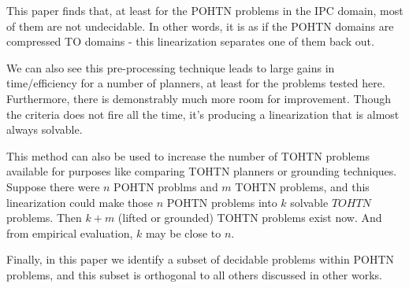 \documentclass[letterpaper]{article} %
\begin{document}
This paper finds that, at least for the POHTN problems in the IPC domain, most of them are not undecidable. In other words, it is as if the POHTN domains are compressed TO domains - this linearization separates one of them back out.

We can also see this pre-processing technique leads to large gains in time/efficiency for a number of planners, at least for the problems tested here. Furthermore, there is demonstrably much more room for improvement. Though the criteria does not fire all the time, it's producing a linearization that is almost always solvable.

This method can also be used to increase the number of TOHTN problems available for purposes like comparing TOHTN planners or grounding techniques. Suppose there were $n$ POHTN problms and $m$ TOHTN problems, and this linearization could make those $n$ POHTN problems into $k$ solvable $TOHTN$ problems. Then $k+m$ (lifted or grounded) TOHTN problems exist now. And from empirical evaluation, $k$ may be close to $n$.

Finally, in this paper we identify a subset of decidable problems within POHTN problems, and this subset is orthogonal to all others discussed in other works.







\end{document}
